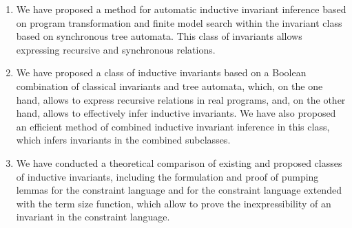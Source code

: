 \begin{enumerate}
\item We have proposed a method for automatic inductive invariant inference based on program transformation and finite model search within the invariant class based on synchronous tree automata. This class of invariants allows expressing recursive and synchronous relations.
\item We have proposed a class of inductive invariants based on a Boolean combination of classical invariants and tree automata, which, on the one hand, allows to express recursive relations in real programs, and, on the other hand, allows to effectively infer inductive invariants. We have also proposed an efficient method of combined inductive invariant inference in this class, which infers invariants in the combined subclasses.
\item We have conducted a theoretical comparison of existing and proposed classes of inductive invariants, including the formulation and proof of pumping lemmas for the constraint language and for the constraint language extended with the term size function, which allow to prove the inexpressibility of an invariant in the constraint language.

\end{enumerate}
